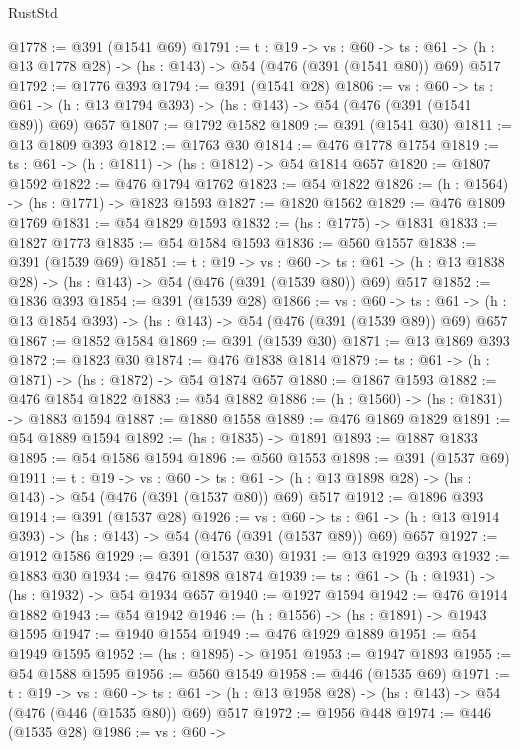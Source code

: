 \begin{lexlean}{RustStd}
\begin{coremodule}
@1778 := @391 (@1541 @69)
@1791 := {t : @19} ->
  {vs : @60} ->
  {ts : @61} -> (h : @13 @1778 @28) -> (hs : @143) -> @54 (@476 (@391 (@1541 @80)) @69) @517
@1792 := @1776 @393
@1794 := @391 (@1541 @28)
@1806 := {vs : @60} ->
  {ts : @61} -> (h : @13 @1794 @393) -> (hs : @143) -> @54 (@476 (@391 (@1541 @89)) @69) @657
@1807 := @1792 @1582
@1809 := @391 (@1541 @30)
@1811 := @13 @1809 @393
@1812 := @1763 @30
@1814 := @476 @1778 @1754
@1819 := {ts : @61} -> (h : @1811) -> (hs : @1812) -> @54 @1814 @657
@1820 := @1807 @1592
@1822 := @476 @1794 @1762
@1823 := @54 @1822
@1826 := (h : @1564) -> (hs : @1771) -> @1823 @1593
@1827 := @1820 @1562
@1829 := @476 @1809 @1769
@1831 := @54 @1829 @1593
@1832 := (hs : @1775) -> @1831
@1833 := @1827 @1773
@1835 := @54 @1584 @1593
@1836 := @560 @1557
@1838 := @391 (@1539 @69)
@1851 := {t : @19} ->
  {vs : @60} ->
  {ts : @61} -> (h : @13 @1838 @28) -> (hs : @143) -> @54 (@476 (@391 (@1539 @80)) @69) @517
@1852 := @1836 @393
@1854 := @391 (@1539 @28)
@1866 := {vs : @60} ->
  {ts : @61} -> (h : @13 @1854 @393) -> (hs : @143) -> @54 (@476 (@391 (@1539 @89)) @69) @657
@1867 := @1852 @1584
@1869 := @391 (@1539 @30)
@1871 := @13 @1869 @393
@1872 := @1823 @30
@1874 := @476 @1838 @1814
@1879 := {ts : @61} -> (h : @1871) -> (hs : @1872) -> @54 @1874 @657
@1880 := @1867 @1593
@1882 := @476 @1854 @1822
@1883 := @54 @1882
@1886 := (h : @1560) -> (hs : @1831) -> @1883 @1594
@1887 := @1880 @1558
@1889 := @476 @1869 @1829
@1891 := @54 @1889 @1594
@1892 := (hs : @1835) -> @1891
@1893 := @1887 @1833
@1895 := @54 @1586 @1594
@1896 := @560 @1553
@1898 := @391 (@1537 @69)
@1911 := {t : @19} ->
  {vs : @60} ->
  {ts : @61} -> (h : @13 @1898 @28) -> (hs : @143) -> @54 (@476 (@391 (@1537 @80)) @69) @517
@1912 := @1896 @393
@1914 := @391 (@1537 @28)
@1926 := {vs : @60} ->
  {ts : @61} -> (h : @13 @1914 @393) -> (hs : @143) -> @54 (@476 (@391 (@1537 @89)) @69) @657
@1927 := @1912 @1586
@1929 := @391 (@1537 @30)
@1931 := @13 @1929 @393
@1932 := @1883 @30
@1934 := @476 @1898 @1874
@1939 := {ts : @61} -> (h : @1931) -> (hs : @1932) -> @54 @1934 @657
@1940 := @1927 @1594
@1942 := @476 @1914 @1882
@1943 := @54 @1942
@1946 := (h : @1556) -> (hs : @1891) -> @1943 @1595
@1947 := @1940 @1554
@1949 := @476 @1929 @1889
@1951 := @54 @1949 @1595
@1952 := (hs : @1895) -> @1951
@1953 := @1947 @1893
@1955 := @54 @1588 @1595
@1956 := @560 @1549
@1958 := @446 (@1535 @69)
@1971 := {t : @19} ->
  {vs : @60} ->
  {ts : @61} -> (h : @13 @1958 @28) -> (hs : @143) -> @54 (@476 (@446 (@1535 @80)) @69) @517
@1972 := @1956 @448
@1974 := @446 (@1535 @28)
@1986 := {vs : @60} ->

\end{coremodule}
\end{lexlean}
